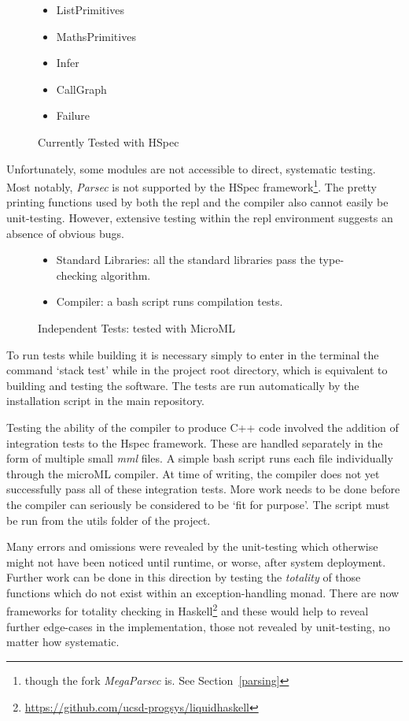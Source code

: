 \documentclass[12pt, a4paper]{report}
\begin{document}
\begin{figure}
    \begin{itemize}
        \item ListPrimitives
        \item MathsPrimitives
        \item Infer
        \item CallGraph
        \item Failure
    \end{itemize}
    \caption{Currently Tested with HSpec}
\label{fig:hspec}
\end{figure}

Unfortunately, some modules are not accessible to direct, systematic testing. Most notably,
\textit{Parsec} is not supported by the HSpec framework\footnote{though the fork
\textit{MegaParsec} is. See Section~\ref{parsing}}. The pretty printing functions used by both the
repl and the compiler also cannot easily be unit-testing. However, extensive testing within the repl
environment suggests an absence of obvious bugs.

\begin{figure}[H]
    \begin{itemize}
        \item Standard Libraries: all the standard libraries pass the type-checking algorithm.
        \item Compiler: a bash script runs compilation tests.
    \end{itemize}
    \caption{Independent Tests: tested with MicroML}
\label{fig:indtests}
\end{figure}

To run tests while building it is necessary simply to enter in the terminal the command `stack test'
while in the project root directory, which is equivalent to building and testing the
software. The tests are run automatically by the installation script in the main repository.

Testing the ability of the compiler to produce C++ code involved the addition of integration tests
to the Hspec framework. These are handled separately in the form of multiple small \textit{mml}
files. A simple bash script runs each file individually through the microML compiler. At time of
writing, the compiler does not yet successfully pass all of these integration tests. More work needs
to be done before the compiler can seriously be considered to be `fit for purpose'. The script must
be run from the utils folder of the project.

Many errors and omissions were revealed by the unit-testing which otherwise might not have
been noticed until runtime, or worse, after system deployment. Further work can be done
in this direction by testing the \textit{totality} of those functions which do not exist
within an exception-handling monad. There are now frameworks for totality checking in
Haskell\footnote{\url{https://github.com/ucsd-progsys/liquidhaskell}} and these would help to reveal
further edge-cases in the implementation, those not revealed by unit-testing, no matter how
systematic.
\end{document}
